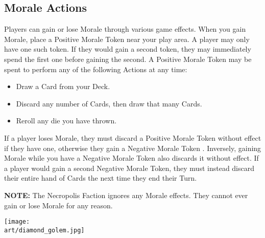 \begin{multicols*}{2}
\subsection*{Morale Actions}
Players can gain or lose Morale through various game effects.
When you gain Morale, place a Positive Morale Token  near your play area.
A player may only have one such token.
If they would gain a second token, they may immediately spend the first one before gaining the second.
A Positive Morale Token may be spent to perform any of the following Actions at any time:
\begin{itemize}
  \item Draw a Card from your Deck.
  \item Discard any number of Cards, then draw that many Cards.
  \item Reroll any die you have thrown.
\end{itemize}

If a player loses Morale, they must discard a Positive Morale Token  without effect if they have one, otherwise they gain a Negative Morale Token .
Inversely, gaining Morale while you have a Negative Morale Token also discards it without effect.
If a player would gain a second Negative Morale Token, they must instead discard their entire hand of Cards the next time they end their Turn.\par
\textbf{NOTE:} The Necropolis  Faction ignores any Morale effects.
They cannot ever gain or lose Morale for any reason.

\vspace*{\fill}

\texttt{[image: \\art/diamond\_golem.jpg]}

\vspace*{\fill}

\end{multicols*}
